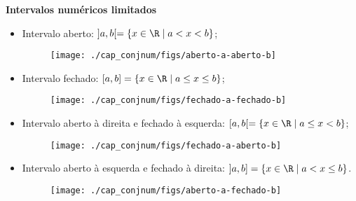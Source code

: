 \textbf{Intervalos numéricos limitados}
\begin{itemize}
 \item Intervalo aberto: $]a, b[= \{x \in \R \mid a < x < b\}$;
 \begin{figure}[H]
 \centering
 \texttt{[image: ./cap\_conjnum/figs/aberto-a-aberto-b]}
 \end{figure}
 \item Intervalo fechado: $[a, b]= \{x \in \R \mid a \leq x \leq b\}$;
 \begin{figure}[H]
 \centering
 \texttt{[image: ./cap\_conjnum/figs/fechado-a-fechado-b]}
 \end{figure}
 \item Intervalo aberto à direita e fechado à esquerda: $[a, b[= \{x \in \R \mid a \leq x < b\}$;
 \begin{figure}[H]
 \centering
 \texttt{[image: ./cap\_conjnum/figs/fechado-a-aberto-b]}
 \end{figure}
 \item Intervalo aberto à esquerda e fechado à direita: $]a, b]= \{x \in \R \mid a < x \leq b\}$.
 \begin{figure}[H]
 \centering
 \texttt{[image: ./cap\_conjnum/figs/aberto-a-fechado-b]}
 \end{figure}
\end{itemize}



